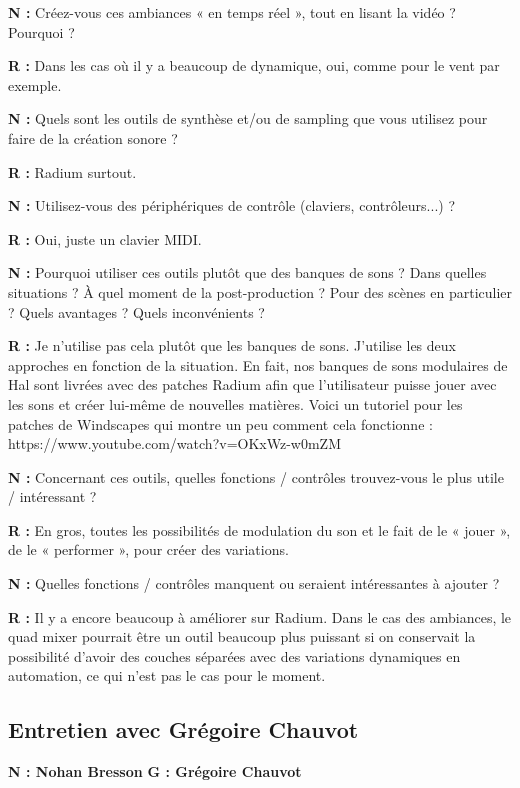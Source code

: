 ﻿\documentclass[12pt]{article}
\begin{document}
\textbf{N :} Créez-vous ces ambiances « en temps réel », tout en lisant la vidéo ? Pourquoi ?

\textbf{R :} Dans les cas où il y a beaucoup de dynamique, oui, comme pour le vent par exemple.

\textbf{N :} Quels sont les outils de synthèse et/ou de sampling que vous utilisez pour faire de la création sonore ?

\textbf{R :} Radium surtout.

\textbf{N :} Utilisez-vous des périphériques de contrôle (claviers, contrôleurs...) ?

\textbf{R :} Oui, juste un clavier MIDI.

\textbf{N :} Pourquoi utiliser ces outils plutôt que des banques de sons ? Dans quelles situations ? À quel moment de la post-production ? Pour des scènes en particulier ? Quels avantages ? Quels inconvénients ?

\textbf{R :} Je n’utilise pas cela plutôt que les banques de sons. J’utilise les deux approches en fonction de la situation. En fait, nos banques de sons modulaires de Hal sont livrées avec des patches Radium afin que l’utilisateur puisse jouer avec les sons et créer lui-même de nouvelles matières. Voici un tutoriel pour les patches de Windscapes qui montre un peu comment cela fonctionne :  https://www.youtube.com/watch?v=OKxWz-w0mZM

\textbf{N :} Concernant ces outils, quelles fonctions / contrôles trouvez-vous le plus utile / intéressant ?

\textbf{R :} En gros, toutes les possibilités de modulation du son et le fait de le « jouer », de le « performer », pour créer des variations.

\textbf{N :} Quelles fonctions / contrôles manquent ou seraient intéressantes à ajouter ?

\textbf{R :} Il y a encore beaucoup à améliorer sur Radium. Dans le cas des ambiances, le quad mixer pourrait être un outil beaucoup plus puissant si on conservait la possibilité d’avoir des couches séparées avec des variations dynamiques en automation, ce qui n’est pas le cas pour le moment.

\subsection{Entretien avec Grégoire Chauvot}
\setlength{\parindent}{0pt}
\textbf{N : Nohan Bresson} 
\textbf{G : Grégoire Chauvot}  
\\
\end{document}
